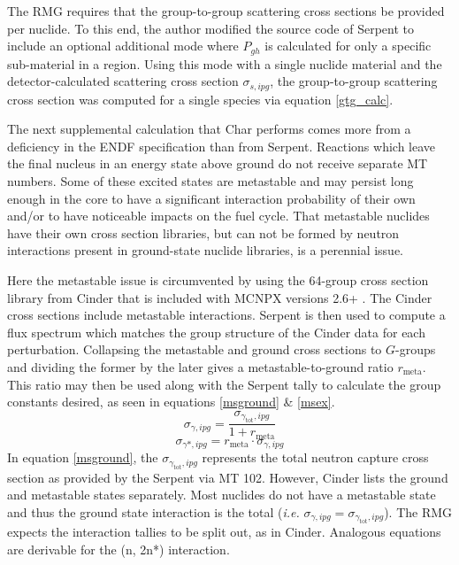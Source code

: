 The RMG requires that the group-to-group scattering cross sections be provided 
per nuclide. To this end, the author modified the source code of Serpent to include an optional 
additional mode where $P_{gh}$ is calculated for only a specific sub-material in a region.    
Using this mode with a single nuclide material and the detector-calculated
scattering cross section $\sigma_{s,ipg}$, the group-to-group scattering cross section was computed 
for a single species via equation \ref{gtg_calc}.

The next supplemental calculation that Char performs comes more from a deficiency in the 
ENDF specification than from Serpent.  Reactions which leave the final nucleus in an energy
state above ground do not receive separate MT numbers.  Some of these excited states
are metastable and may persist long enough in the core to have a significant interaction 
probability of their own and/or to have noticeable impacts on the fuel cycle. That metastable 
nuclides have their own cross section libraries,
but can not be formed by neutron interactions present in ground-state nuclide libraries, is a perennial issue.

Here the metastable issue is circumvented by using the 64-group cross section library from Cinder that is 
included with MCNPX versions 2.6+ \cite{Pelowitz2008}.  The Cinder cross sections include metastable
interactions.  Serpent is then used to compute a 
flux spectrum which matches the group structure of the Cinder data for each perturbation.  
Collapsing the metastable and ground cross sections to $G$-groups and dividing the former by 
the later gives a metastable-to-ground ratio $r_{\mbox{meta}}$.  This ratio may then be used along with 
the Serpent tally to calculate the group constants desired, as seen in equations \ref{msground} \& 
\ref{msex}.
\begin{equation}
\label{msground}
\sigma_{\gamma,ipg} = \frac{\sigma_{\gamma_{\mbox{tot}},ipg}}{1 + r_{\mbox{meta}}}
\end{equation}
\begin{equation}
\label{msex}
\sigma_{\gamma*,ipg} = r_{\mbox{meta}} \cdot \sigma_{\gamma,ipg}
\end{equation}
In equation \ref{msground}, the $\sigma_{\gamma_{\mbox{tot}},ipg}$ represents the total neutron
capture cross section as provided by the Serpent via MT 102.  However, Cinder 
lists the ground and metastable states separately.  Most nuclides do not have a metastable state and thus the 
ground state interaction is the total (\emph{i.e.} $\sigma_{\gamma,ipg} = \sigma_{\gamma_{\mbox{tot}},ipg}$).
The RMG expects the interaction tallies to be split out, as in Cinder.  Analogous equations are 
derivable for the (n, 2n*) interaction.

